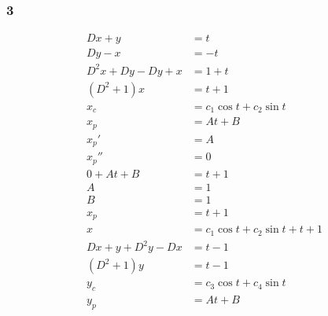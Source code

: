 \documentclass{article}
\begin{document}
\subsubsection{3}

\begin{align*}
  D x + y                                                        & = t                                \\
  D y - x                                                        & = -t                               \\
  D^2 x + D y - Dy + x                                           & = 1 + t                            \\
  (D^2 + 1) x                                                    & = t + 1                            \\
  x_c                                                            & = c_1 \cos t + c_2 \sin t          \\
  x_p                                                            & = A t + B                          \\
  x_p'                                                           & = A                                \\
  x_p''                                                          & = 0                                \\
  0 + A t + B                                                    & = t + 1                            \\
  A                                                              & = 1                                \\
  B                                                              & = 1                                \\
  x_p                                                            & = t + 1                            \\
  x                                                              & = c_1 \cos t + c_2 \sin t + t + 1  \\
  D x + y + D^2 y - D x                                          & = t - 1                            \\
  (D^2 + 1) y                                                    & = t - 1                            \\
  y_c                                                            & = c_3 \cos t + c_4 \sin t          \\
  y_p                                                            & = A t + B                          \\

\end{align*}
\end{document}
